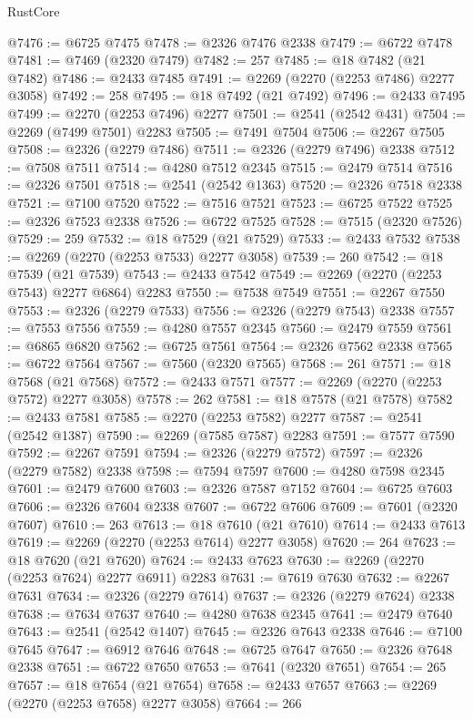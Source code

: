 \begin{lexlean}{RustCore}
\begin{coremodule}
@7476 := @6725 @7475
@7478 := @2326 @7476 @2338
@7479 := @6722 @7478
@7481 := @7469 (@2320 @7479)
@7482 := 257
@7485 := @18 @7482 (@21 @7482)
@7486 := @2433 @7485
@7491 := @2269 (@2270 (@2253 @7486) @2277 @3058)
@7492 := 258
@7495 := @18 @7492 (@21 @7492)
@7496 := @2433 @7495
@7499 := @2270 (@2253 @7496) @2277
@7501 := @2541 (@2542 @431)
@7504 := @2269 (@7499 @7501) @2283
@7505 := @7491 @7504
@7506 := @2267 @7505
@7508 := @2326 (@2279 @7486)
@7511 := @2326 (@2279 @7496) @2338
@7512 := @7508 @7511
@7514 := @4280 @7512 @2345
@7515 := @2479 @7514
@7516 := @2326 @7501
@7518 := @2541 (@2542 @1363)
@7520 := @2326 @7518 @2338
@7521 := @7100 @7520
@7522 := @7516 @7521
@7523 := @6725 @7522
@7525 := @2326 @7523 @2338
@7526 := @6722 @7525
@7528 := @7515 (@2320 @7526)
@7529 := 259
@7532 := @18 @7529 (@21 @7529)
@7533 := @2433 @7532
@7538 := @2269 (@2270 (@2253 @7533) @2277 @3058)
@7539 := 260
@7542 := @18 @7539 (@21 @7539)
@7543 := @2433 @7542
@7549 := @2269 (@2270 (@2253 @7543) @2277 @6864) @2283
@7550 := @7538 @7549
@7551 := @2267 @7550
@7553 := @2326 (@2279 @7533)
@7556 := @2326 (@2279 @7543) @2338
@7557 := @7553 @7556
@7559 := @4280 @7557 @2345
@7560 := @2479 @7559
@7561 := @6865 @6820
@7562 := @6725 @7561
@7564 := @2326 @7562 @2338
@7565 := @6722 @7564
@7567 := @7560 (@2320 @7565)
@7568 := 261
@7571 := @18 @7568 (@21 @7568)
@7572 := @2433 @7571
@7577 := @2269 (@2270 (@2253 @7572) @2277 @3058)
@7578 := 262
@7581 := @18 @7578 (@21 @7578)
@7582 := @2433 @7581
@7585 := @2270 (@2253 @7582) @2277
@7587 := @2541 (@2542 @1387)
@7590 := @2269 (@7585 @7587) @2283
@7591 := @7577 @7590
@7592 := @2267 @7591
@7594 := @2326 (@2279 @7572)
@7597 := @2326 (@2279 @7582) @2338
@7598 := @7594 @7597
@7600 := @4280 @7598 @2345
@7601 := @2479 @7600
@7603 := @2326 @7587 @7152
@7604 := @6725 @7603
@7606 := @2326 @7604 @2338
@7607 := @6722 @7606
@7609 := @7601 (@2320 @7607)
@7610 := 263
@7613 := @18 @7610 (@21 @7610)
@7614 := @2433 @7613
@7619 := @2269 (@2270 (@2253 @7614) @2277 @3058)
@7620 := 264
@7623 := @18 @7620 (@21 @7620)
@7624 := @2433 @7623
@7630 := @2269 (@2270 (@2253 @7624) @2277 @6911) @2283
@7631 := @7619 @7630
@7632 := @2267 @7631
@7634 := @2326 (@2279 @7614)
@7637 := @2326 (@2279 @7624) @2338
@7638 := @7634 @7637
@7640 := @4280 @7638 @2345
@7641 := @2479 @7640
@7643 := @2541 (@2542 @1407)
@7645 := @2326 @7643 @2338
@7646 := @7100 @7645
@7647 := @6912 @7646
@7648 := @6725 @7647
@7650 := @2326 @7648 @2338
@7651 := @6722 @7650
@7653 := @7641 (@2320 @7651)
@7654 := 265
@7657 := @18 @7654 (@21 @7654)
@7658 := @2433 @7657
@7663 := @2269 (@2270 (@2253 @7658) @2277 @3058)
@7664 := 266

\end{coremodule}
\end{lexlean}
